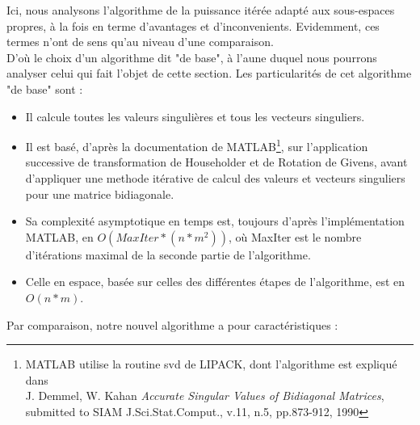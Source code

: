 \documentclass[a4paper,12pt]{article}
\begin{document}
    Ici, nous analysons l'algorithme de la puissance itérée adapté aux sous-espaces propres, à la fois en terme d'avantages et d'inconvenients. Evidemment, ces termes n'ont de sens qu'au niveau d'une comparaison. \\
    D'où le choix d'un algorithme dit "de base", à l'aune duquel nous pourrons analyser celui qui fait l'objet de cette section.
    Les particularités de cet algorithme "de base" sont : \\

        \begin{itemize}
            \item Il calcule toutes les valeurs singulières et tous les vecteurs singuliers.
            \item Il est basé, d'après la documentation de MATLAB\footnote{MATLAB utilise la routine svd de LIPACK, dont l'algorithme est expliqué dans \\    J. Demmel, W. Kahan \textit{Accurate Singular Values of Bidiagonal Matrices}, submitted to SIAM J.Sci.Stat.Comput., v.11, n.5, pp.873-912, 1990}, sur l'application successive de transformation de Householder et de Rotation de Givens, avant d'appliquer une methode itérative de calcul des valeurs et vecteurs singuliers pour une matrice bidiagonale.
            \item Sa complexité asymptotique en temps est, toujours d'après l'implémentation MATLAB, en $O(MaxIter*(n*m^2))$, où MaxIter est le nombre d'itérations maximal de la seconde partie de l'algorithme.
            \item Celle en espace, basée sur celles des différentes étapes de l'algorithme, est en $O(n*m)$.
        \end{itemize}
\bigskip
    Par comparaison, notre nouvel algorithme a pour caractéristiques : \\
\end{document}
